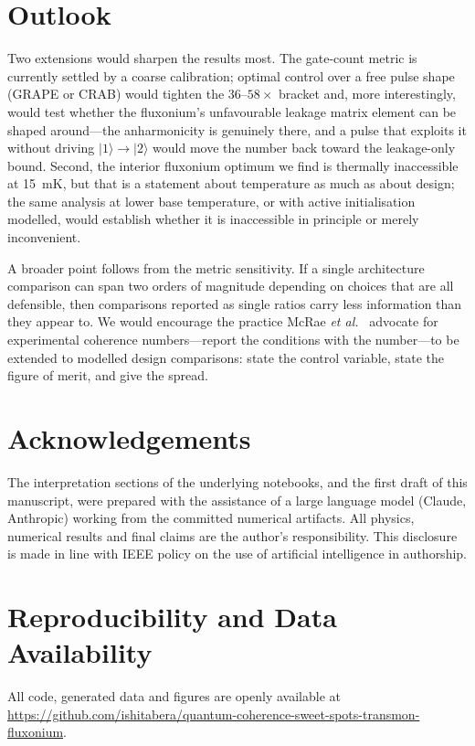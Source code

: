 \documentclass[journal]{IEEEtran}
\begin{document}
\section{Outlook}

Two extensions would sharpen the results most. The gate-count metric is currently settled by a
coarse calibration; optimal control over a free pulse shape (GRAPE or CRAB) would tighten the
$36$--$58\times$ bracket and, more interestingly, would test whether the fluxonium's
unfavourable leakage matrix element can be shaped around---the anharmonicity is genuinely
there, and a pulse that exploits it without driving $|1\rangle \to |2\rangle$ would move the
number back toward the leakage-only bound. Second, the interior fluxonium optimum we find is
thermally inaccessible at \SI{15}{\milli\kelvin}, but that is a statement about temperature as
much as about design; the same analysis at lower base temperature, or with active
initialisation modelled, would establish whether it is inaccessible in principle or merely
inconvenient.

A broader point follows from the metric sensitivity. If a single architecture comparison can
span two orders of magnitude depending on choices that are all defensible, then comparisons
reported as single ratios carry less information than they appear to. We would encourage the
practice McRae \emph{et al.}~\cite{mcrae2021} advocate for experimental coherence
numbers---report the conditions with the number---to be extended to modelled design
comparisons: state the control variable, state the figure of merit, and give the spread.

\section*{Acknowledgements}

The interpretation sections of the underlying notebooks, and the first draft of this
manuscript, were prepared with the assistance of a large language model (Claude, Anthropic)
working from the committed numerical artifacts. All physics, numerical results and final
claims are the author's responsibility. This disclosure is made in line with IEEE policy on
the use of artificial intelligence in authorship.

\section*{Reproducibility and Data Availability}

All code, generated data and figures are openly available at
\url{https://github.com/ishitabera/quantum-coherence-sweet-spots-transmon-fluxonium}.
\end{document}

